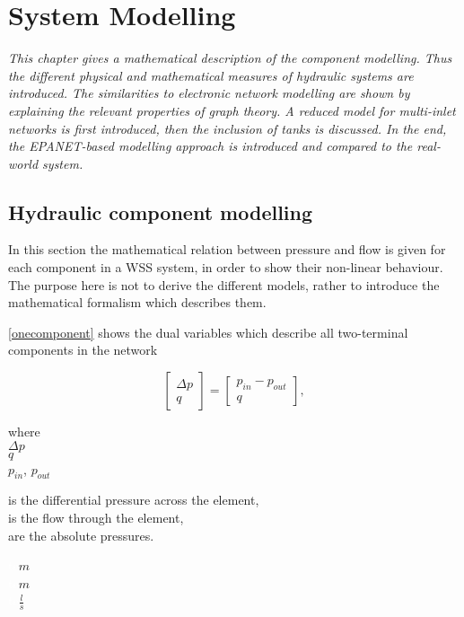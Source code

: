 \chapter{System Modelling}
\label{system_modelling}

\emph{This chapter gives a mathematical description of the component modelling. Thus the different physical and mathematical measures of hydraulic systems are introduced. The similarities to electronic network modelling are shown by explaining the relevant properties of graph theory. A reduced model for multi-inlet networks is first introduced, then the inclusion of tanks is discussed. In the end, the EPANET-based modelling approach is introduced and compared to the real-world system.}

\section{Hydraulic component modelling}
\label{hydraulic_component_modelling}

In this section the mathematical relation between pressure and flow is given for each component in a WSS system, in order to show their non-linear behaviour. The purpose here is not to derive the different models, rather to introduce the mathematical formalism which describes them.

\eqref{onecomponent} shows the dual variables which describe all two-terminal components in the network 

\begin{equation}
\label{onecomponent}
 \begin{bmatrix}
    \Delta p \\
    q
\end{bmatrix}
=
 \begin{bmatrix}
    p_{in} - p_{out} \\
    q
\end{bmatrix},
\end{equation}

 \begin{minipage}[t]{0.20\textwidth}
where\\
\hspace*{8mm} $\Delta p$ \\
\hspace*{8mm} $q$ \\
\hspace*{8mm} $p_{in}$, $p_{out}$ 
\end{minipage}
\begin{minipage}[t]{0.68\textwidth}
\vspace*{2mm}
is the differential pressure across the element,\\
is the flow through the element,\\
are the absolute pressures.
\end{minipage}
\begin{minipage}[t]{0.10\textwidth}
\vspace*{2mm}
\textcolor{White}{te}$\unit{m}$\\
\textcolor{White}{te}$\unit{m}$\\
\textcolor{White}{te}$\unit{\frac{l}{s}}$
\end{minipage}


